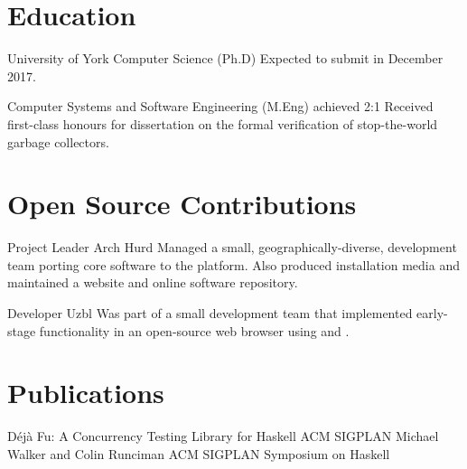 \documentclass[a4paper]{barrucadu-cv}
\begin{document}
\section{Education}

\begin{educated}{University of York}
  {Computer Science (Ph.D)}
  {}
  {Expected to submit in December 2017.}

  {Computer Systems and Software Engineering (M.Eng)}
  {achieved 2:1}
  {Received first-class honours for dissertation on the formal
    verification of stop-the-world garbage collectors.}
\end{educated}

\section{Open Source Contributions}

  {Project Leader}
  {Arch Hurd}
  {}
  {Managed a small, geographically-diverse, development team porting
    core  software to the 
    platform. Also produced installation media and maintained a
    website and online software repository.}

  {Developer}
  {Uzbl}
  {}
  {Was part of a small development team that implemented early-stage
    functionality in an open-source web browser using  and
    .}

\section{Publications}

  {Déjà Fu: A Concurrency Testing Library for Haskell}
  {ACM SIGPLAN}
  {Michael Walker and Colin Runciman}
  {ACM SIGPLAN Symposium on Haskell}
\end{document}
